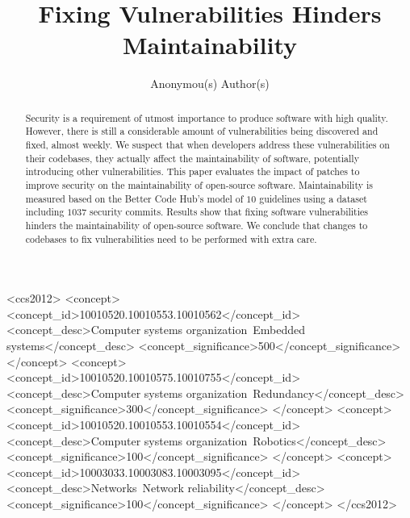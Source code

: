 \documentclass[sigconf,review]{acmart}
\newcommand\Rui[1]{\nb{Rui}{blue}{#1}}
\begin{document}
\title{Fixing Vulnerabilities Hinders Maintainability}

\author{
    Anonymou(s) Author(s)
}

\renewcommand{\shortauthors}{Anon. et al.}

\begin{abstract}
	
Security is a requirement of utmost importance to produce software with 
high quality. However, there is still a considerable amount of 
vulnerabilities being discovered and fixed, almost weekly. We suspect 
that when developers address these vulnerabilities on their codebases, 
they actually affect the maintainability of software, potentially 
introducing other vulnerabilities. This paper evaluates the impact of 
patches to improve security on the maintainability of open-source software. 
Maintainability is measured based on the Better Code Hub’s model of $10$ 
guidelines using a dataset including $1037$ security commits. \Rui{Add numbers} Results show 
that fixing software vulnerabilities hinders the maintainability of 
open-source software. We conclude that changes to codebases 
to fix vulnerabilities need to be performed with extra care.
	
\end{abstract}



\begin{CCSXML}
<ccs2012>
 <concept>
  <concept_id>10010520.10010553.10010562</concept_id>
  <concept_desc>Computer systems organization~Embedded systems</concept_desc>
  <concept_significance>500</concept_significance>
 </concept>
 <concept>
  <concept_id>10010520.10010575.10010755</concept_id>
  <concept_desc>Computer systems organization~Redundancy</concept_desc>
  <concept_significance>300</concept_significance>
 </concept>
 <concept>
  <concept_id>10010520.10010553.10010554</concept_id>
  <concept_desc>Computer systems organization~Robotics</concept_desc>
  <concept_significance>100</concept_significance>
 </concept>
 <concept>
  <concept_id>10003033.10003083.10003095</concept_id>
  <concept_desc>Networks~Network reliability</concept_desc>
  <concept_significance>100</concept_significance>
 </concept>
</ccs2012>
\end{CCSXML}

\end{document}
